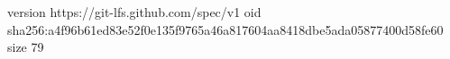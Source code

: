 version https://git-lfs.github.com/spec/v1
oid sha256:a4f96b61ed83e52f0e135f9765a46a817604aa8418dbe5ada05877400d58fe60
size 79
